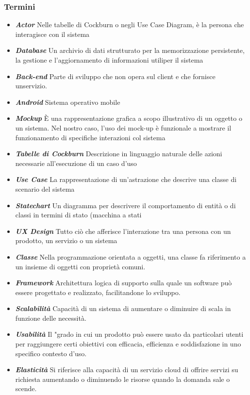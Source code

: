 \documentclass{article}
\begin{document}
			\subsubsection{Termini}
			\begin{itemize}
				\item \textbf{\textit{\textcolor{dark_purple}{Actor}}} Nelle tabelle di Cockburn o negli Use Case Diagram, è la persona che interagisce con il sistema
				\item \textbf{\textit{\textcolor{dark_purple}{Database}}} Un archivio di dati strutturato per la memorizzazione persistente, la gestione e l’aggiornamento di informazioni utiliper il sistema
				\item \textbf{\textit{\textcolor{dark_purple}{Back-end}}} Parte di sviluppo che non opera sul client e che fornisce unservizio.
				\item \textbf{\textit{\textcolor{dark_purple}{Android}}} Sistema operativo mobile
				\item \textbf{\textit{\textcolor{dark_purple}{Mockup}}} È una rappresentazione grafica a scopo illustrativo di un oggetto o un sistema. Nel nostro caso, l’uso dei mock-up è funzionale a mostrare il funzionamento di specifiche interazioni col sistema
				\item \textbf{\textit{\textcolor{dark_purple}{Tabelle di Cockburn}}} Descrizione in linguaggio naturale delle azioni necessarie all’esecuzione di un caso d’uso
				\item \textbf{\textit{\textcolor{dark_purple}{Use Case}}} La rappresentazione di un’astrazione che descrive una classe di scenario del sistema
				\item \textbf{\textit{\textcolor{dark_purple}{Statechart}}} Un diagramma per descrivere il comportamento di entità o di classi in termini di stato (macchina a stati
				\item \textbf{\textit{\textcolor{dark_purple}{UX Design}}} Tutto ciò che afferisce l’interazione tra una persona con un prodotto, un servizio o un sistema
				\item \textbf{\textit{\textcolor{dark_purple}{Classe}}} Nella programmazione orientata a oggetti, una classe fa riferimento a un insieme di oggetti con proprietà comuni.
				\item \textbf{\textit{\textcolor{dark_purple}{Framework}}} Architettura logica di supporto sulla quale un software può essere progettato e realizzato, facilitandone lo sviluppo.
				\item \textbf{\textit{\textcolor{dark_purple}{Scalabilità}}} Capacità di un sistema di aumentare o diminuire di scala in funzione delle necessità.
				\item \textbf{\textit{\textcolor{dark_purple}{Usabilità}}} Il "grado in cui un prodotto può essere usato da particolari utenti per raggiungere certi obiettivi con efficacia, efficienza e soddisfazione in uno specifico contesto d’uso.
				\item \textbf{\textit{\textcolor{dark_purple}{Elasticità}}} Si riferisce alla capacità di un servizio cloud di offrire servizi su richiesta aumentando o diminuendo le risorse quando la domanda sale o scende.
			\end{itemize}
			\newpage
\end{document}
